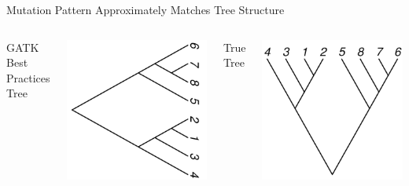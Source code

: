 \documentclass{beamer}
\begin{document}

\begin{frame}{Mutation Pattern Approximately Matches Tree Structure}
\begin{columns}
	\begin{center}
	GATK Best Practices Tree
	\end{center}
	\includegraphics[width=\linewidth]{gatk_tree_rightwards.pdf}
	\begin{center}
	True Tree
	\end{center}
	\includegraphics[width=\linewidth,angle=90]{true_tree.pdf}
\end{columns}
\end{frame}
\end{document}
